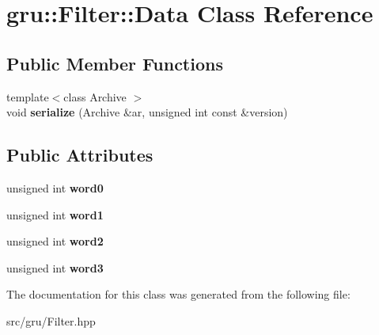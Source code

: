 \hypertarget{classgru_1_1Filter_1_1Data}{\section{gru\-:\-:\-Filter\-:\-:\-Data \-Class \-Reference}
\label{classgru_1_1Filter_1_1Data}
}
\subsection*{\-Public \-Member \-Functions}
\begin{DoxyCompactItemize}
\item 
\hypertarget{classgru_1_1Filter_1_1Data_a6fa912566c5f10afdd70313dc53032f1}{{\footnotesize template$<$class Archive $>$ }\\void {\bfseries serialize} (\-Archive \&ar, unsigned int const \&version)}\label{classgru_1_1Filter_1_1Data_a6fa912566c5f10afdd70313dc53032f1}

\end{DoxyCompactItemize}
\subsection*{\-Public \-Attributes}
\begin{DoxyCompactItemize}
\item 
\hypertarget{classgru_1_1Filter_1_1Data_a44e65c6b73076e17c75b77da9c36f038}{unsigned int {\bfseries word0}}\label{classgru_1_1Filter_1_1Data_a44e65c6b73076e17c75b77da9c36f038}

\item 
\hypertarget{classgru_1_1Filter_1_1Data_aa0b5c7a261ebedfb9bf317b3f763e29c}{unsigned int {\bfseries word1}}\label{classgru_1_1Filter_1_1Data_aa0b5c7a261ebedfb9bf317b3f763e29c}

\item 
\hypertarget{classgru_1_1Filter_1_1Data_a4f8d6b2f502e7383b2d37122a0e9d233}{unsigned int {\bfseries word2}}\label{classgru_1_1Filter_1_1Data_a4f8d6b2f502e7383b2d37122a0e9d233}

\item 
\hypertarget{classgru_1_1Filter_1_1Data_a6619c0291e2186120a9cd41886a2f794}{unsigned int {\bfseries word3}}\label{classgru_1_1Filter_1_1Data_a6619c0291e2186120a9cd41886a2f794}

\end{DoxyCompactItemize}


\-The documentation for this class was generated from the following file\-:\begin{DoxyCompactItemize}
\item 
src/gru/\-Filter.\-hpp\end{DoxyCompactItemize}
